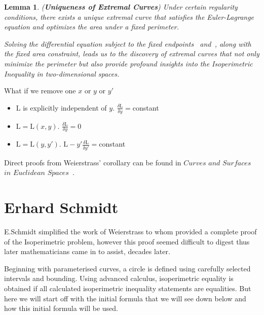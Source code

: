 \documentclass[a4paper]{book}
\newtheorem{lemma}[theorem]{Lemma}%
\numberwithin{theorem}{section}%
\begin{document}
\begin{lemma}(\textbf{Uniqueness of Extremal Curves})
    Under certain regularity conditions, there exists a unique extremal curve that satisfies the Euler-Lagrange equation and optimizes the area under a fixed perimeter.

    Solving the differential equation subject to the fixed endpoints~\citep{goldstein1980classical} and~\citep{hilbert1985methods}, along with the fixed area constraint, leads us to the discovery of extremal curves that not only minimize the perimeter but also provide profound insights into the Isoperimetric Inequality in two-dimensional spaces. 
\end{lemma}
\newpage
What if we remove one $x$ or $y$ or $y'$
\begin{itemize}
    \item $\mathrm{L}$ is explicitly independent of $y$. $\frac{\delta\mathrm{L}}{\delta y}=$constant
    \item $\mathrm{L}=\mathrm{L}(x,y)$. $\frac{\delta\mathrm{L}}{\delta y}=0$
    \item $\mathrm{L}=\mathrm{L}(y,y')$. $\mathrm{L}-y'\frac{\delta\mathrm{L}}{\delta y'}=$constant
\end{itemize}

Direct proofs from Weierstrass' corollary can be found in $Curves$ $and$ $Surfaces$ $in$ $Euclidean$ $Spaces$~\citep{chern1966curves}.

\section{Erhard Schmidt}
E.Schmidt simplified the work of Weierstrass to whom provided a complete proof of the Isoperimetric problem, however this proof seemed difficult to digest thus later mathematicians came in to assist, decades later. 

Beginning with parameterised curves, a circle is defined using carefully selected intervals and bounding. Using advanced calculus, isoperimetric equality is obtained if all calculated isoperimetric inequality statements are equalities. But here we will start off with the initial formula that we will see down below and how this initial formula will be used.
\end{document}
